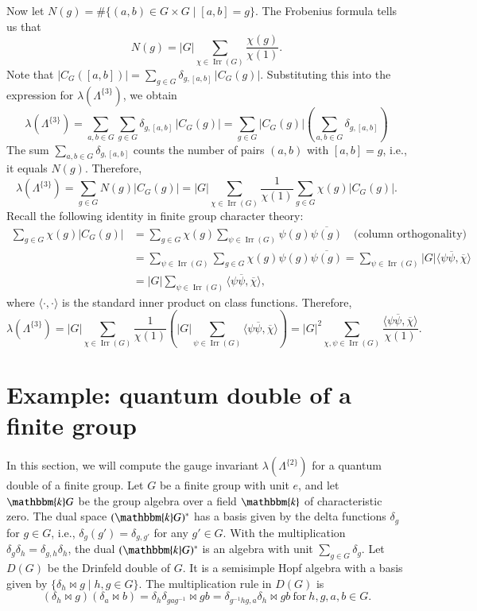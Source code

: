 \documentclass[11pt]{amsart}
\numberwithin{equation}{section}
\begin{document}
Now let $N(g)=\#\{(a,b)\in G\times G \mid [a,b]=g\}$. The Frobenius formula tells us that
\[
N(g)=|G|\sum_{\chi\in\operatorname{Irr}(G)} \frac{\chi(g)}{\chi(1)}.
\] 
Note that $
|C_G([a,b])| = \sum_{g\in G}\delta_{g,[a,b]} \, |C_G(g)|.
$ Substituting this into the expression for $\lambda(\Lambda^{\{3\}})$, we obtain 
\[
\lambda(\Lambda^{\{3\}})
= \sum_{a,b\in G} \sum_{g\in G}\delta_{g,[a,b]} \, |C_G(g)|= \sum_{g\in G}|C_G(g)|\left(\sum_{a,b\in G}\delta_{g,[a,b]} \right)
\]
The sum $\sum_{a,b\in G}\delta_{g,[a,b]}$ counts the number of pairs $(a,b)$ with $[a,b]=g$, i.e., it equals $N(g)$. Therefore,
\[
\lambda(\Lambda^{\{3\}})
= \sum_{g\in G} N(g) |C_G(g)|=|G| \sum_{\chi\in\operatorname{Irr}(G)} \frac{1}{\chi(1)}
  \sum_{g\in G} \chi(g) |C_G(g)|.
\]
Recall the following identity in finite group character theory:
\[
\begin{aligned}
\sum_{g\in G} \chi(g)|C_G(g)|
&= \sum_{g\in G} \chi(g) \sum_{\psi\in\operatorname{Irr}(G)} \psi(g)\overline{\psi(g)} \quad \text{(column orthogonality)}\\
&= \sum_{\psi\in\operatorname{Irr}(G)} \sum_{g\in G} \chi(g)\psi(g)\overline{\psi(g)}= \sum_{\psi\in\operatorname{Irr}(G)} |G| \langle \psi\overline{\psi}, \overline{\chi} \rangle\\
&= |G| \sum_{\psi\in\operatorname{Irr}(G)} \langle \psi\overline{\psi}, \overline{\chi} \rangle,
\end{aligned}
\] where $\langle \cdot,\cdot \rangle$ is the standard inner product on class functions.
Therefore,
\[
\lambda(\Lambda^{\{3\}})
= |G| \sum_{\chi\in\operatorname{Irr}(G)} \frac{1}{\chi(1)}
  \left( |G| \sum_{\psi\in\operatorname{Irr}(G)} \langle \psi\overline{\psi}, \overline{\chi} \rangle \right)
= |G|^2 \sum_{\chi,\psi\in\operatorname{Irr}(G)}
  \frac{\langle \psi\overline{\psi},\overline{ \chi }\rangle}{\chi(1)}.
\]



\section{\bf Example: quantum double of a finite group}

In this section, we will compute the gauge invariant $\lambda(\Lambda^{\{2\}})$ for a quantum double of a finite group. Let $G$ be a finite group with unit $e$, and let $\mathbbm{k}G$ be the group algebra over a field $\mathbbm{k}$ of characteristic zero. The dual space $(\mathbbm{k}G)^*$ has a basis given by the delta functions $\delta_g$ for $g\in G$, i.e., $\delta_g(g')=\delta_{g,g'}$ for any $g'\in G$. With the multiplication $\delta_g\delta_h=\delta_{g,h}\delta_h$, the dual $(\mathbbm{k}G)^*$ is an algebra with unit $\sum_{g\in G}\delta_g$. Let $D(G)$ be the Drinfeld double of $G$. It is a semisimple Hopf algebra with a basis given by $\{\delta_h\bowtie g\mid h, g\in G\}.$
The multiplication rule in $D(G)$ is
\[
(\delta_h\bowtie  g)(\delta_a\bowtie  b) = \delta_h \delta_{g a g^{-1}}\bowtie  g b = \delta_{g^{-1} h g, a} \delta_h\bowtie  g b\ \text{for}\ h,g,a,b\in G.
\]
\end{document}

